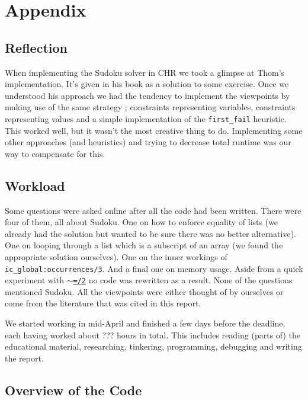 \section*{Appendix}
\label{sec:appendix}

\subsection*{Reflection}\label{sec:reflection}

When implementing the Sudoku solver in CHR we took a glimpse at Thom's implementation. It's given in his book as a solution to some exercise. Once we understood his approach we had the tendency to implement the viewpoints by making use of the same strategy ; constraints representing variables, constraints representing values and a simple implementation of the \texttt{first\_fail} heuristic. This worked well, but it wasn't the most creative thing to do. Implementing some other approaches (and heuristics) and trying to decrease total runtime was our way to compensate for this.

\subsection*{Workload}\label{sec:workload}

Some questions were asked online after all the code had been written. There were four of them, all about Sudoku. One on how to enforce equality of lists (we already had the solution but wanted to be sure there was no better alternative). One on looping through a list which is a subscript of an array (we found the appropriate solution ourselves). One on the inner workings of \texttt{ic\_global:occurrences/3}. And a final one on memory usage. Aside from a quick experiment with \href{https://eclipseclp.org/doc/bips/kernel/termcomp/TE-2.html}{\texttt{$\sim$=/2}} no code was rewritten as a result. None of the questions mentioned Sudoku. All the viewpoints were either thought of by ourselves or come from the literature that was cited in this report.\\\par

We started working in mid-April and finished a few days before the deadline, each having worked about ??? hours in total. This includes reading (parts of) the educational material, researching, tinkering, programming, debugging and writing the report.

\subsection*{Overview of the Code}\label{sec:code}
